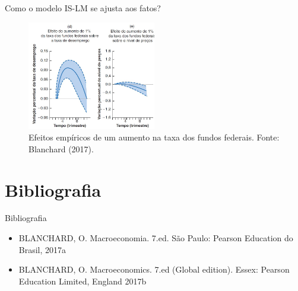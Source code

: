 \documentclass[10pt]{beamer}
\begin{document}
\begin{frame}{Como o modelo IS-LM se ajusta aos fatos?}
\begin{figure}
    \centering
    \includegraphics[width=0.5\textwidth]{./figures/aula082_fig16.JPG}
    \caption{Efeitos empíricos de um aumento na taxa dos fundos federais. Fonte: Blanchard (2017).}
    \label{fig10}
\end{figure}
\end{frame}

\section{Bibliografia}
\begin{frame}{ Bibliografia}
    \begin{itemize}
        \item BLANCHARD, O. Macroeconomia. 7.ed. São Paulo: Pearson Education do Brasil, 2017a\medskip        
        \item BLANCHARD, O. Macroeconomics. 7.ed (Global edition). Essex: Pearson Education Limited, England 2017b
    \end{itemize}
\end{frame}
\end{document}
